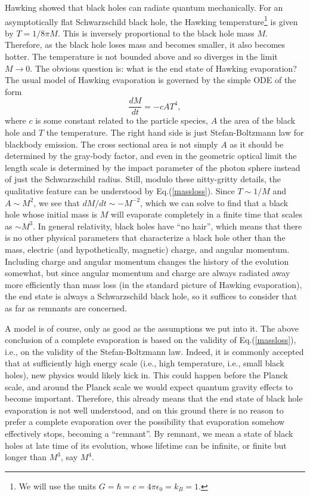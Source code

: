 \documentclass[preprintnumbers, floatfix, preprintnumbers, letterpaper, twocolumn, superscriptaddress,nofootinbib]{revtex4-2}
\begin{document}
Hawking showed that black holes can radiate quantum mechanically. For an asymptotically flat Schwarzschild black hole, the Hawking temperature\footnote{We will use the units $G=\hbar=c=4\pi\epsilon_0=k_B=1$.} is given by $T=1/8\pi M$. This is inversely proportional to the black hole mass $M$. Therefore, as the black hole loses mass and becomes smaller, it also becomes hotter. The temperature is not bounded above and so diverges in the limit $M \to 0$. The obvious question is: what is the end state of Hawking evaporation? The usual model of Hawking evaporation is governed by the simple ODE of the form
\begin{equation}\label{massloss}
\frac{dM}{dt} = -cAT^4,
\end{equation}
where $c$ is some constant related to the particle species, $A$ the area of the black hole and $T$ the temperature. The right hand side is just Stefan-Boltzmann law for blackbody emission. The cross sectional area is not simply $A$ as it should be determined by the gray-body factor, and even in the geometric optical limit the length scale  is determined by the impact parameter of the photon sphere instead of just the Schwarzschild radius. Still, modulo these nitty-gritty details, the qualitative feature can be understood by Eq.(\ref{massloss}). Since $T\sim 1/M$ and $A \sim M^2$, we see that $dM/dt \sim -M^{-2}$, which we can solve to find that a black hole whose initial mass is $M$ will evaporate completely in a finite time that scales as $\sim M^3$. In general relativity, black holes have ``no hair'', which means that there is no other physical parameters that characterize a black hole other than the mass, electric (and hypothetically, magnetic) charge, and angular momentum. Including charge and angular momentum changes the history of the evolution somewhat, but since angular momentum and charge are always radiated away more efficiently than mass loss (in the standard picture of Hawking evaporation), the end state is always a Schwarzschild black hole, so it suffices to consider that as far as remnants are concerned.

A model is of course, only as good as the assumptions we put into it. The above conclusion of a complete evaporation is based on the validity of Eq.(\ref{massloss}), i.e., on the validity of the Stefan-Boltzmann law. Indeed, it is commonly accepted that at sufficiently high energy scale (i.e., high temperature, i.e., small black holes), new physics would likely kick in. This could happen before the Planck scale, and around the Planck scale we would expect quantum gravity effects to become important. Therefore, this already means that the end state of black hole evaporation is not well understood, and on this ground there is no reason to prefer a complete evaporation over the possibility that evaporation somehow effectively stops, becoming a ``remnant''. By remnant, we mean a state of black holes at late time of its evolution, whose lifetime can be infinite, or finite but longer than $M^3$, say $M^4$. 
\end{document}
